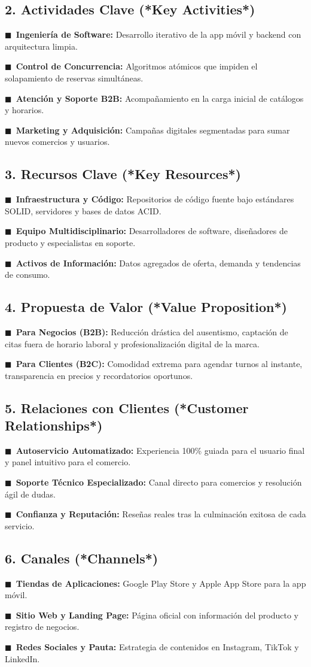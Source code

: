 \documentclass[11pt,a4paper]{article}
\newcommand{\bulletBlue}{\textcolor{primaryBlue}{\footnotesize$\blacksquare$}\ }
\newcommand{\destacado}[2]{\noindent\bulletBlue\textbf{#1:} #2\par\vspace{3pt}}
\begin{document}
\subsection{2. Actividades Clave (*Key Activities*)}
\destacado{Ingeniería de Software}{Desarrollo iterativo de la app móvil y backend con arquitectura limpia.}
\destacado{Control de Concurrencia}{Algoritmos atómicos que impiden el solapamiento de reservas simultáneas.}
\destacado{Atención y Soporte B2B}{Acompañamiento en la carga inicial de catálogos y horarios.}
\destacado{Marketing y Adquisición}{Campañas digitales segmentadas para sumar nuevos comercios y usuarios.}

\subsection{3. Recursos Clave (*Key Resources*)}
\destacado{Infraestructura y Código}{Repositorios de código fuente bajo estándares SOLID, servidores y bases de datos ACID.}
\destacado{Equipo Multidisciplinario}{Desarrolladores de software, diseñadores de producto y especialistas en soporte.}
\destacado{Activos de Información}{Datos agregados de oferta, demanda y tendencias de consumo.}

\subsection{4. Propuesta de Valor (*Value Proposition*)}
\destacado{Para Negocios (B2B)}{Reducción drástica del ausentismo, captación de citas fuera de horario laboral y profesionalización digital de la marca.}
\destacado{Para Clientes (B2C)}{Comodidad extrema para agendar turnos al instante, transparencia en precios y recordatorios oportunos.}

\subsection{5. Relaciones con Clientes (*Customer Relationships*)}
\destacado{Autoservicio Automatizado}{Experiencia 100\% guiada para el usuario final y panel intuitivo para el comercio.}
\destacado{Soporte Técnico Especializado}{Canal directo para comercios y resolución ágil de dudas.}
\destacado{Confianza y Reputación}{Reseñas reales tras la culminación exitosa de cada servicio.}

\subsection{6. Canales (*Channels*)}
\destacado{Tiendas de Aplicaciones}{Google Play Store y Apple App Store para la app móvil.}
\destacado{Sitio Web y Landing Page}{Página oficial con información del producto y registro de negocios.}
\destacado{Redes Sociales y Pauta}{Estrategia de contenidos en Instagram, TikTok y LinkedIn.}
\end{document}
